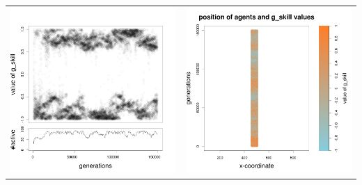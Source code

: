 \documentclass[a4paper,10pt]{article}
\begin{document}
\begin{table}[h!]
\begin{tabular}{cc}
\newline
\includegraphics[width=\imgSize]{images/5StaticEnv/Gplot58_staticEnv0}&\includegraphics[width=\imgSize]{images/5StaticEnv/Gplot58Static_staticEnv0}\\
\end{tabular}

\end{table}
\end{document}
